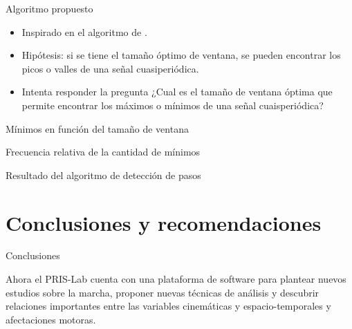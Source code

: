 \documentclass{beamer} %
\begin{document}
\begin{frame}{Algoritmo propuesto}
    \begin{itemize}
        \item Inspirado en el algoritmo de \cite{scholkmann}.
        \item Hipótesis: si se tiene el tamaño óptimo de ventana, se pueden encontrar los picos o valles de una señal cuasiperiódica.
        \item Intenta responder la pregunta ¿Cual es el tamaño de ventana óptima que permite encontrar los máximos o mínimos de una señal cuaisperiódica?
    \end{itemize}
\end{frame} 

\begin{frame}{Mínimos en función del tamaño de ventana}
    
\end{frame}

\begin{frame}{Frecuencia relativa de la cantidad de mínimos}
    
\end{frame}

\begin{frame}{Resultado del algoritmo de detección de pasos}
    
\end{frame}

\section{Conclusiones y recomendaciones}

\begin{frame}{Conclusiones}
    \begin{block}{}
        Ahora el PRIS-Lab cuenta con una plataforma de software para plantear nuevos estudios sobre la marcha, proponer nuevas técnicas de análisis y descubrir relaciones importantes entre las variables cinemáticas y espacio-temporales y afectaciones motoras. 
    \end{block}
\end{frame}
\end{document}
